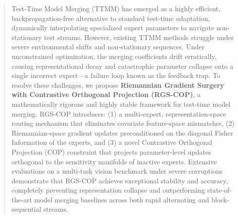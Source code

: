 \documentclass{article}
\theoremstyle{plain}
\theoremstyle{definition}
\theoremstyle{remark}
\begin{document}

\printAffiliationsAndNotice{}

\begin{abstract}
Test-Time Model Merging (TTMM) has emerged as a highly efficient, backpropagation-free alternative to standard test-time adaptation, dynamically interpolating specialized expert parameters to navigate non-stationary test streams. However, existing TTMM methods struggle under severe environmental shifts and non-stationary sequences. Under unconstrained optimization, the merging coefficients drift erratically, causing representational decay and catastrophic parameter collapse onto a single incorrect expert---a failure loop known as the feedback trap. To resolve these challenges, we propose \textbf{Riemannian Gradient Surgery with Contrastive Orthogonal Projection (RGS-COP)}, a mathematically rigorous and highly stable framework for test-time model merging. RGS-COP introduces: (1) a multi-expert, representation-space routing mechanism that eliminates covariate feature-space mismatches, (2) Riemannian-space gradient updates preconditioned on the diagonal Fisher Information of the experts, and (3) a novel Contrastive Orthogonal Projection (COP) constraint that projects parameter-level updates orthogonal to the sensitivity manifolds of inactive experts. Extensive evaluations on a multi-task vision benchmark under severe corruptions demonstrate that RGS-COP achieves exceptional stability and accuracy, completely preventing representation collapse and outperforming state-of-the-art model merging baselines across both rapid alternating and block-sequential streams.
\end{abstract}
\end{document}

